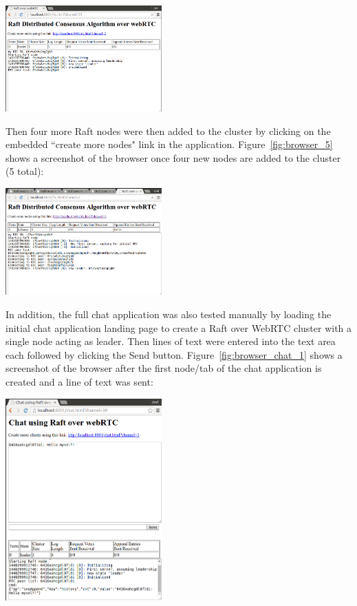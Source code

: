 \documentclass[9pt]{extarticle}
\begin{document}
\begin{multicols}{2}
\begin{center}
    \includegraphics[width=0.45\textwidth]{imgs/browser_1.png}
    \label{fig:browser_1}
\end{center}

Then four more Raft nodes were then added to the cluster by clicking
on the embedded ``create more nodes" link in the application.
Figure~\ref{fig:browser_5} shows a screenshot of the browser once four
new nodes are added to the cluster (5 total):

\begin{center}
    \includegraphics[width=0.45\textwidth]{imgs/browser_5.png}
    \label{fig:browser_5}
\end{center}

In addition, the full chat application was also tested manually by
loading the initial chat application landing page to create a Raft
over WebRTC cluster with a single node acting as leader. Then lines
of text were entered into the text area each followed by clicking the
Send button. Figure~\ref{fig:browser_chat_1} shows a screenshot of the
browser after the first node/tab of the chat application is created
and a line of text was sent:

\begin{center}
    \includegraphics[width=0.45\textwidth]{imgs/chat_1a.png}
    \label{fig:browser_chat_1}
\end{center}


\end{multicols}
\end{document}
